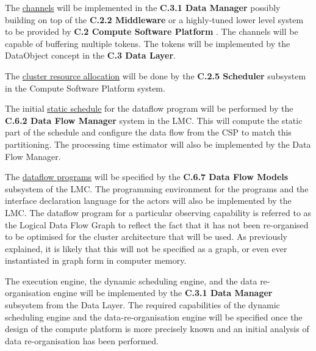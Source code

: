 \documentclass[11pt,a4paper]{article}
\begin{document}
The \underline{channels} will be implemented in the {\bf C.3.1 Data
  Manager} possibly building on top of the {\bf C.2.2 Middleware} or a
highly-tuned lower level system to be provided by {\bf C.2 Compute
  Software Platform} . The channels will be capable of buffering
multiple tokens.  The tokens will be implemented by the DataObject
concept in the {\bf C.3 Data Layer}.

The \underline{cluster resource allocation} will be done by the {\bf
  C.2.5 Scheduler} subsystem in the Compute Software Platform system.

The initial \underline{static schedule} for the dataflow program will
be performed by the {\bf C.6.2 Data Flow Manager} system in the
LMC. This will compute the static part of the schedule and configure
the data flow from the CSP to match this partitioning. The processing
time estimator will also be implemented by the Data Flow Manager.

The \underline{dataflow programs} will be specified by the {\bf C.6.7
  Data Flow Models} subsystem of the LMC.  The programming environment
for the programs and the interface declaration language for the actors
will also be implemented by the LMC.  The dataflow program for a
particular observing capability is referred to as the Logical Data
Flow Graph to reflect the fact that it has not been re-organised to be
optimised for the cluster architecture that will be used. As
previously explained, it is likely that this will not be specified as
a graph, or even ever instantiated in graph form in computer memory.

The execution engine, the dynamic scheduling engine, and the data
re-organisation engine will be implemented by the {\bf C.3.1 Data
  Manager} subsystem from the Data Layer. The required capabilities of
the dynamic scheduling engine and the data-re-organisation engine will
be specified once the design of the compute platform is more precisely
known and an initial analysis of data re-organisation has been
performed.

\clearpage
{}
%
\end{document}
